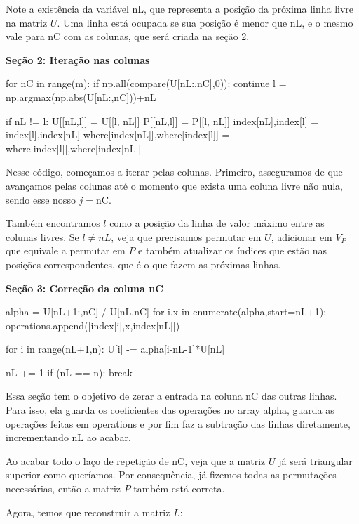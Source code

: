 \documentclass[11pt, a4paper]{article}
\begin{document}
Note a existência da variável nL, que representa a posição da próxima linha livre na matriz \(U\). Uma linha está ocupada se sua posição é menor que nL, e o mesmo vale para nC com as colunas, que será criada na seção 2.

\textbf{Seção 2: Iteração nas colunas}
\begin{code}
    for nC in range(m):
        if np.all(compare(U[nL:,nC],0)):
            continue
        l = np.argmax(np.abs(U[nL:,nC]))+nL
        
        if nL != l:
            U[[nL,l]] = U[[l, nL]]
            P[[nL,l]] = P[[l, nL]]
            index[nL],index[l] = index[l],index[nL]
            where[index[nL]],where[index[l]] = where[index[l]],where[index[nL]]
\end{code}

Nesse código, começamos a iterar pelas colunas. Primeiro, asseguramos de que avançamos pelas colunas até o momento que exista uma coluna livre não nula, sendo esse nosso \(j=\text{nC}\). 

Também encontramos \(l\) como a posição da linha de valor máximo entre as colunas livres. Se \(l\ne nL\), veja que precisamos permutar em \(U\), adicionar em \(V_P\) que equivale a permutar em \(P\) e também atualizar os índices que estão nas posições correspondentes, que é o que fazem as próximas linhas.

\textbf{Seção 3: Correção da coluna nC}
\begin{code}
        alpha = U[nL+1:,nC] / U[nL,nC]
        for i,x in enumerate(alpha,start=nL+1):
            operations.append([index[i],x,index[nL]])
        
        for i in range(nL+1,n):
            U[i] -= alpha[i-nL-1]*U[nL]

        nL += 1
        if (nL == n):
            break
\end{code}

Essa seção tem o objetivo de zerar a entrada na coluna nC das outras linhas. Para isso, ela guarda os coeficientes das operações no array alpha, guarda as operações feitas em operations e por fim faz a subtração das linhas diretamente, incrementando nL ao acabar.

Ao acabar todo o laço de repetição de nC, veja que a matriz \(U\) já será triangular superior como queríamos. Por consequência, já fizemos todas as permutações necessárias, então a matriz \(P\) também está correta. 

Agora, temos que reconstruir a matriz \(L\): 
\end{document}
